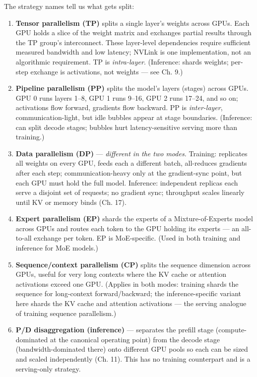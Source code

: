The strategy names tell us what gets split:

\begin{enumerate}
\def\labelenumi{\arabic{enumi}.}
\item
  \textbf{Tensor parallelism (TP)} splits a single layer's weights
  across GPUs. Each GPU holds a slice of the weight matrix and exchanges
  partial results through the TP group's interconnect. These layer-level
  dependencies require sufficient measured bandwidth and low latency;
  NVLink is one implementation, not an algorithmic requirement. TP is
  \emph{intra-layer}. (Inference: shards weights; per-step exchange is
  activations, not weights --- see Ch. 9.)
\item
  \textbf{Pipeline parallelism (PP)} splits the model's layers (stages)
  across GPUs. GPU 0 runs layers 1--8, GPU 1 runs 9--16, GPU 2 runs
  17--24, and so on; activations flow forward, gradients flow backward.
  PP is \emph{inter-layer}, communication-light, but idle bubbles appear
  at stage boundaries. (Inference: can split decode stages; bubbles hurt
  latency-sensitive serving more than training.)
\item
  \textbf{Data parallelism (DP)} --- \emph{different in the two modes.}
  Training: replicates all weights on every GPU, feeds each a different
  batch, all-reduces gradients after each step; communication-heavy only
  at the gradient-sync point, but each GPU must hold the full model.
  Inference: independent replicas each serve a disjoint set of requests;
  no gradient sync; throughput scales linearly until KV or memory binds
  (Ch. 17).
\item
  \textbf{Expert parallelism (EP)} shards the experts of a
  Mixture-of-Experts model across GPUs and routes each token to the GPU
  holding its experts --- an all-to-all exchange per token. EP is
  MoE-specific. (Used in both training and inference for MoE models.)
\item
  \textbf{Sequence/context parallelism (CP)} splits the sequence
  dimension across GPUs, useful for very long contexts where the KV
  cache or attention activations exceed one GPU. (Applies in both modes:
  training shards the sequence for long-context forward/backward; the
  inference-specific variant here shards the KV cache and attention
  activations --- the serving analogue of training sequence
  parallelism.)
\item
  \textbf{P/D disaggregation (inference)} --- separates the prefill
  stage (compute-dominated at the canonical operating point) from the
  decode stage (bandwidth-dominated there) onto different GPU pools so
  each can be sized and scaled independently (Ch. 11). This has no
  training counterpart and is a serving-only strategy.
\end{enumerate}


